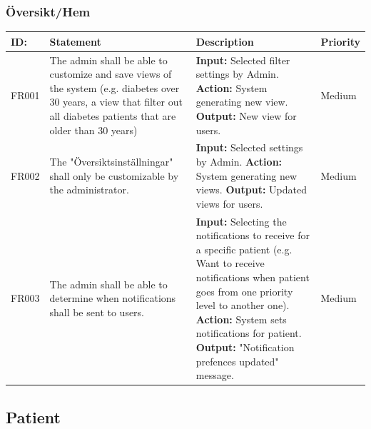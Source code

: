 \documentclass{scrreprt}
\begin{document}
\subsubsection{Översikt/Hem}
\begin{center}
\begin{tabularx}{\linewidth}{| l | X | X | l |}
\hline
\textbf{ID:} & \textbf{Statement} & \textbf{Description} & \textbf{Priority} \\ 
\hline
FR001 & The admin shall be able to customize and save views of the system (e.g. diabetes over 30 years, a view that filter out all diabetes patients that are older than 30 years) & \textbf{Input:} Selected filter settings by Admin. \newline \textbf{Action:} System generating new view. \newline \textbf{Output:} New view for users. & Medium \\ 
\hline
FR002 & The "Översiktsinställningar" shall only be customizable by the administrator. & \textbf{Input:} Selected settings by Admin. \newline \textbf{Action:} System generating new views. \newline \textbf{Output:} Updated views for users. & Medium \\ 
\hline
FR003 & The admin shall be able to determine when notifications shall be sent to users. & \textbf{Input:} Selecting the notifications to receive for a specific patient (e.g. Want to receive notifications when patient goes from one priority level to another one).
\newline \textbf{Action:} System sets notifications for patient.
\newline \textbf{Output:} "Notification prefences updated" message. & Medium \\ 
\hline
\end{tabularx}
\end{center}

\subsection{Patient}
\end{document}
